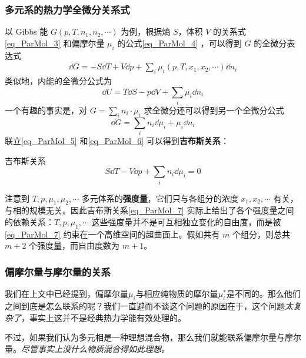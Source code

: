 \subsubsection{多元系的热力学全微分关系式}
以 Gibbs 能 $G(p,T,n_1,n_2,\cdots)$ 为例，根据熵 $S$，体积 $V$ 的关系式\autoref{eq_ParMol_3} 和偏摩尔量 $\mu_i$ 的公式\autoref{eq_ParMol_4} ，可以得到 $G$ 的全微分表达式
\begin{equation}\label{eq_ParMol_5}
\begin{aligned}
\dd G=-S\dd T+V\dd p+\sum_i \mu_i(p,T,x_1,x_2,\cdots) \dd n_i
\end{aligned}
\end{equation}
类似地，内能的全微分公式为
\begin{equation}
\dd U=T\dd S-p\dd V+\sum_i \mu_i\dd n_i
\end{equation}
一个有趣的事实是，对 $G=\sum_i n_i\cdot \mu_i$ 求全微分还可以得到另一个全微分公式
\begin{equation}\label{eq_ParMol_6}
\dd G=\sum_i n_i \dd \mu_i + \mu_i \dd n_i
\end{equation}
联立\autoref{eq_ParMol_5} 和\autoref{eq_ParMol_6} 可以得到\textbf{吉布斯关系}：
\begin{theorem}{吉布斯关系}
\begin{equation}\label{eq_ParMol_7}
S\dd T-V\dd p+\sum_i n_i\dd \mu_i=0
\end{equation}
\end{theorem}
注意到 $T,p,\mu_1,\mu_2,\cdots$ 多元体系的\textbf{强度量}，它们只与各组分的浓度 $x_1,x_2,\cdots $ 有关，与相的规模无关。因此吉布斯关系\autoref{eq_ParMol_7} 实际上给出了各个强度量之间的依赖关系：$T,p,\mu_1,\cdots$ 这些强度量并不是可互相独立变化的自由度，而是被\autoref{eq_ParMol_7} 约束在一个高维空间的超曲面上。假如共有 $m$ 个组分，则总共 $m+2$ 个强度量，而自由度数为 $m+1$。

\subsubsection{偏摩尔量与摩尔量的关系}
我们在上文中已经提到，偏摩尔量$\mu_i$与相应纯物质的摩尔量$\mu_i^*$是不同的。那么他们之间到底是怎么联系的呢？我们一直避而不谈这个问题的原因在于，这个问题\textsl{太复杂了}，事实上这并不是经典热力学能有效处理的。

不过，如果我们认为多元相是一种理想混合物，那么我们就能联系偏摩尔量与摩尔量。\textsl{尽管事实上没什么物质混合得如此理想。}